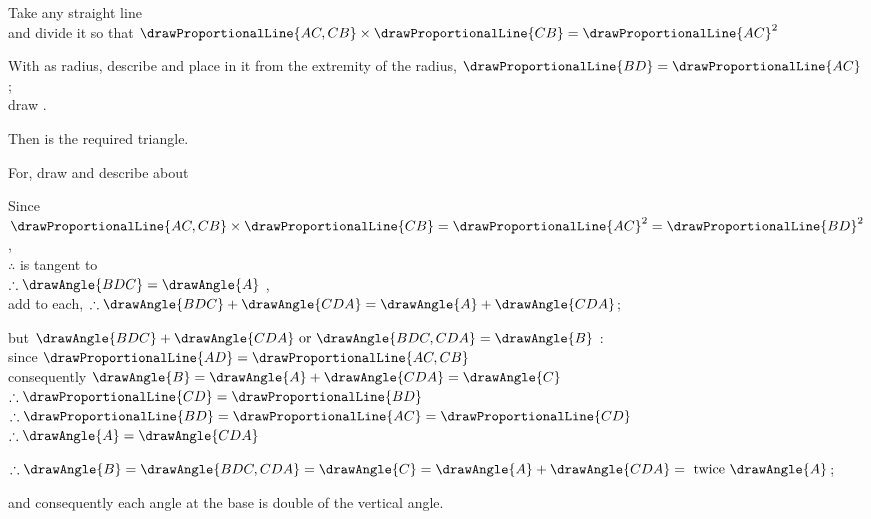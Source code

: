 \documentclass[booklanguage=english]{byrnebook}
\begin{document}
\begin{center}
Take any straight line  \\
and divide it so that $\drawProportionalLine{AC,CB} \times \drawProportionalLine{CB} = \drawProportionalLine{AC}^2$ 

With  as radius, describe  and place in it from the extremity of the radius, $\drawProportionalLine{BD} = \drawProportionalLine{AC}$ ;\\
draw .

Then  is the required triangle.

For, draw  and describe  about  

Since $\drawProportionalLine{AC,CB} \times \drawProportionalLine{CB} = \drawProportionalLine{AC}^2 = \drawProportionalLine{BD}^2$,\\
$\therefore$  is tangent to \circleF\ \\
$\therefore \drawAngle{BDC} = \drawAngle{A}$ ,\\
add  to each, $\therefore \drawAngle{BDC} + \drawAngle{CDA} = \drawAngle{A} + \drawAngle{CDA}$;

but $\drawAngle{BDC} + \drawAngle{CDA} \mbox{ or } \drawAngle{BDC,CDA} = \drawAngle{B}$ :\\
since $\drawProportionalLine{AD} = \drawProportionalLine{AC,CB}$ \\
consequently $\drawAngle{B} = \drawAngle{A} + \drawAngle{CDA} = \drawAngle{C}$ \\
$\therefore \drawProportionalLine{CD} = \drawProportionalLine{BD}$ \\
$\therefore \drawProportionalLine{BD} = \drawProportionalLine{AC} = \drawProportionalLine{CD}$ \byref{\constref}\\
$\therefore \drawAngle{A} = \drawAngle{CDA}$ 

$\therefore \drawAngle{B} = \drawAngle{BDC,CDA} = \drawAngle{C} = \drawAngle{A} + \drawAngle{CDA} = \mbox{ twice } \drawAngle{A}$;

and consequently each angle at the base is double of the vertical angle.
\end{center}
\end{document}
